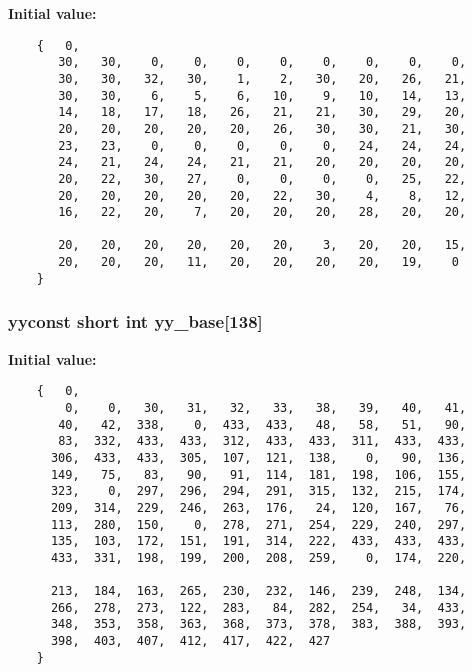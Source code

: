 {\bf Initial value:}

\footnotesize\begin{verbatim}
    {   0,
       30,   30,    0,    0,    0,    0,    0,    0,    0,    0,
       30,   30,   32,   30,    1,    2,   30,   20,   26,   21,
       30,   30,    6,    5,    6,   10,    9,   10,   14,   13,
       14,   18,   17,   18,   26,   21,   21,   30,   29,   20,
       20,   20,   20,   20,   20,   26,   30,   30,   21,   30,
       23,   23,    0,    0,    0,    0,    0,   24,   24,   24,
       24,   21,   24,   24,   21,   21,   20,   20,   20,   20,
       20,   22,   30,   27,    0,    0,    0,    0,   25,   22,
       20,   20,   20,   20,   20,   22,   30,    4,    8,   12,
       16,   22,   20,    7,   20,   20,   20,   28,   20,   20,

       20,   20,   20,   20,   20,   20,    3,   20,   20,   15,
       20,   20,   20,   11,   20,   20,   20,   20,   19,    0
    }\end{verbatim}\normalsize 
{}
\subsubsection{\setlength{\rightskip}{0pt plus 5cm}yyconst short int yy\_\-base[138]\hspace{0.3cm}{\tt  [static]}}\label{vcd__lexer_8c_a90}


{\bf Initial value:}

\footnotesize\begin{verbatim}
    {   0,
        0,    0,   30,   31,   32,   33,   38,   39,   40,   41,
       40,   42,  338,    0,  433,  433,   48,   58,   51,   90,
       83,  332,  433,  433,  312,  433,  433,  311,  433,  433,
      306,  433,  433,  305,  107,  121,  138,    0,   90,  136,
      149,   75,   83,   90,   91,  114,  181,  198,  106,  155,
      323,    0,  297,  296,  294,  291,  315,  132,  215,  174,
      209,  314,  229,  246,  263,  176,   24,  120,  167,   76,
      113,  280,  150,    0,  278,  271,  254,  229,  240,  297,
      135,  103,  172,  151,  191,  314,  222,  433,  433,  433,
      433,  331,  198,  199,  200,  208,  259,    0,  174,  220,

      213,  184,  163,  265,  230,  232,  146,  239,  248,  134,
      266,  278,  273,  122,  283,   84,  282,  254,   34,  433,
      348,  353,  358,  363,  368,  373,  378,  383,  388,  393,
      398,  403,  407,  412,  417,  422,  427
    }\end{verbatim}\normalsize 
{}
